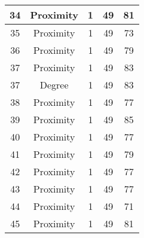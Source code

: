 \documentclass[results.tex]{subfiles}
\begin{document}
\begin{center}
\begin{tabular}{| c || c | c | c | c |}
            \hline
            34                      & Proximity                    & 1                      & 49                      & 81                   \\
            \hline
            35                      & Proximity                    & 1                      & 49                      & 73                   \\
            \hline
            36                      & Proximity                    & 1                      & 49                      & 79                   \\
            \hline
            37                      & Proximity                    & 1                      & 49                      & 83                   \\
            \hline
            37                      & Degree                       & 1                      & 49                      & 83                   \\
            \hline
            38                      & Proximity                    & 1                      & 49                      & 77                   \\
            \hline
            39                      & Proximity                    & 1                      & 49                      & 85                   \\
            \hline
            40                      & Proximity                    & 1                      & 49                      & 77                   \\
            \hline
            41                      & Proximity                    & 1                      & 49                      & 79                   \\
            \hline
            42                      & Proximity                    & 1                      & 49                      & 77                   \\
            \hline
            43                      & Proximity                    & 1                      & 49                      & 77                   \\
            \hline
            44                      & Proximity                    & 1                      & 49                      & 71                   \\
            \hline
            45                      & Proximity                    & 1                      & 49                      & 81                   \\

\end{tabular}
\end{center}
\end{document}
